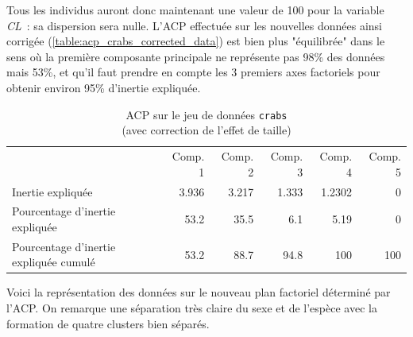 \documentclass[a4paper,11pt]{report}
\begin{document}
Tous les individus auront donc maintenant une valeur de 100 pour la variable \textit{CL}~: sa dispersion sera nulle. L'ACP effectuée sur les nouvelles données ainsi corrigée (\autoref{table:acp_crabs_corrected_data}) est bien plus "équilibrée" dans le sens où la première composante principale ne représente pas 98\% des données mais 53\%, et qu'il faut prendre en compte les 3 premiers axes factoriels pour obtenir environ 95\% d'inertie expliquée.



\begin{table}[H]
	\centering
	\captionsetup{justification=centering, margin=2cm}
	\caption{ACP sur le jeu de données \texttt{crabs} \\(avec correction de l'effet de taille)}
	\label{table:acp_crabs_corrected_data}
	\begin{tabular}{lrrrrr}
		& Comp. 1 & Comp. 2 & Comp. 3 & Comp. 4 & Comp. 5 \\
		Inertie expliquée & 3.936 & 3.217 & 1.333 & 1.2302 & 0 \\
		Pourcentage d'inertie expliquée & 53.2 & 35.5 & 6.1 & 5.19 & 0 \\
		Pourcentage d'inertie expliquée cumulé & 53.2 & 88.7 & 94.8 & 100 & 100
	\end{tabular}
\end{table}



Voici la représentation des données sur le nouveau plan factoriel déterminé par l'ACP. On remarque une séparation très claire du sexe et de l'espèce avec la formation de quatre clusters bien séparés.
\end{document}
